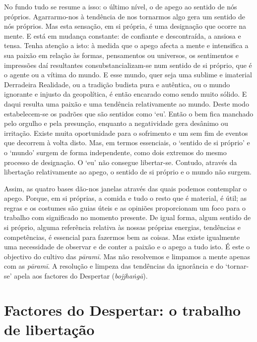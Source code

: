 No fundo tudo se resume a isso: o último nível, o de apego ao sentido de nós próprios. Agarrarmo-nos à tendência de nos tornarmos algo gera um sentido de nós próprios. Mas esta sensação, em si própria, é uma designação que ocorre na mente. E está em mudança constante: de confiante e descontraída, a ansiosa e tensa. Tenha atenção a isto: à medida que o apego afecta a mente e intensifica a sua paixão em relação às formas, pensamentos ou universos, os sentimentos e impressões daí resultantes consubstancializam-se num sentido de si próprio, que é o agente ou a vítima do mundo. E esse mundo, quer seja uma sublime e imaterial Derradeira Realidade, ou a tradição budista pura e autêntica, ou o mundo ignorante e injusto da geopolítica, é então encarado como sendo muito sólido. E daqui resulta uma paixão e uma tendência relativamente ao mundo. Deste modo estabelecem-se os padrões que são sentidos como `eu'. Então o bem fica manchado pelo orgulho e pela presunção, enquanto a negatividade gera desânimo ou irritação. Existe muita oportunidade para o sofrimento e um sem fim de eventos que decorrem à volta disto. Mas, em termos essenciais, o `sentido de si próprio' e o `mundo' surgem de forma independente, como dois extremos do mesmo processo de designação. O `eu' não consegue libertar-se. Contudo, através da libertação relativamente ao apego, o sentido de si próprio e o mundo não surgem.

Assim, as quatro bases dão-nos janelas através das quais podemos contemplar o apego. Porque, em si próprias, a comida e tudo o resto que é material, é útil; as regras e os costumes são guias úteis e as opiniões proporcionam um foco para o trabalho com significado no momento presente. De igual forma, algum sentido de si próprio, alguma referência relativa às nossas próprias energias, tendências e competências, é essencial para fazermos bem as coisas. Mas existe igualmente uma necessidade de observar e de conter a paixão e o apego a tudo isto. É este o objectivo do cultivo das \emph{pāramī}. Mas não resolvemos e limpamos a mente apenas com as \emph{pāramī}. A resolução e limpeza das tendências da ignorância e do `tornar-se' apela aos factores do Despertar (\emph{bojjhaṅgā}).

\section{Factores do Despertar: o trabalho de libertação}

